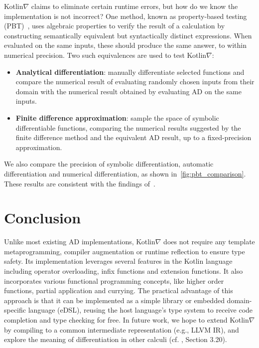 \documentclass{article}
\begin{document}
Kotlin$\nabla$ claims to eliminate certain runtime errors, but how do we know the implementation is not incorrect? One method, known as property-based testing (PBT)~\citep{fink1997property}, uses algebraic properties to verify the result of a calculation by constructing semantically equivalent but syntactically distinct expressions. When evaluated on the same inputs, these should produce the same answer, to within numerical precision. Two such equivalences are used to test Kotlin$\nabla$: \\
%
\begin{itemize}
    \item \textbf{Analytical differentiation}: manually differentiate selected functions and compare the numerical result of evaluating randomly chosen inputs from their domain with the numerical result obtained by evaluating AD on the same inputs.
    \item \textbf{Finite difference approximation}: sample the space of symbolic differentiable functions, comparing the numerical results suggested by the finite difference method and the equivalent AD result, up to a fixed-precision approximation. \\
\end{itemize}

We also compare the precision of symbolic differentiation, automatic differentiation and numerical differentiation, as shown in~\autoref{fig:pbt_comparison}. These results are consistent with the findings of~\citet{laue2019equivalence}.

\section{Conclusion}

Unlike most existing AD implementations, Kotlin$\nabla$ does not require any template metaprogramming, compiler augmentation or runtime reflection to ensure type safety. Its implementation leverages several features in the Kotlin language including operator overloading, infix functions and extension functions. It also incorporates various functional programming concepts, like higher order functions, partial application and currying. The practical advantage of this approach is that it can be implemented as a simple library or embedded domain-specific language (eDSL), reusing the host language's type system to receive code completion and type checking for free. In future work, we hope to extend Kotlin$\nabla$ by compiling to a common intermediate representation (e.g., LLVM IR), and explore the meaning of differentiation in other calculi (cf. \citet{considine2019programming}, Section 3.20).



\end{document}
